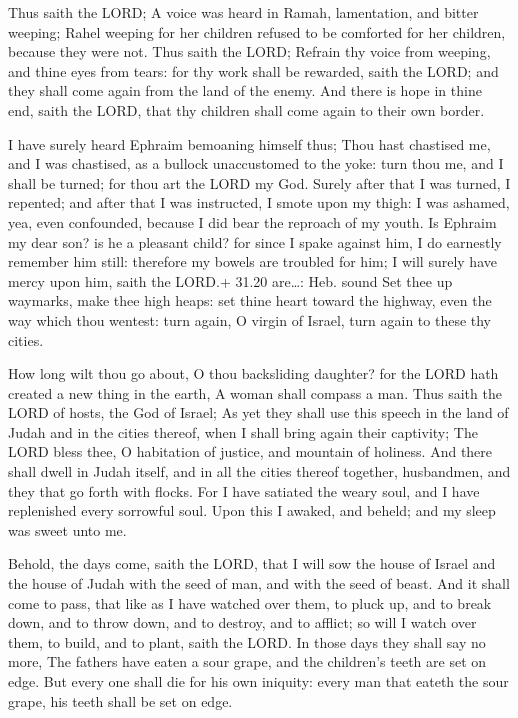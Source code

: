  Thus saith the LORD; A voice was heard in Ramah,
lamentation, and bitter weeping; Rahel weeping for her children refused
to be comforted for her children, because they were not. 
Thus saith the LORD; Refrain thy voice from weeping, and thine eyes from
tears: for thy work shall be rewarded, saith the LORD; and they shall
come again from the land of the enemy.  And there is hope
in thine end, saith the LORD, that thy children shall come again to
their own border.

 I have surely heard Ephraim bemoaning himself thus; Thou
hast chastised me, and I was chastised, as a bullock unaccustomed to the
yoke: turn thou me, and I shall be turned; for thou art the LORD my God.
 Surely after that I was turned, I repented; and after that
I was instructed, I smote upon my thigh: I was ashamed, yea, even
confounded, because I did bear the reproach of my youth. 
Is Ephraim my dear son? is he a pleasant child? for since I spake
against him, I do earnestly remember him still: therefore my bowels are
troubled for him; I will surely have mercy upon him, saith the LORD.+
31.20 are\ldots: Heb. sound  Set thee up waymarks, make
thee high heaps: set thine heart toward the highway, even the way which
thou wentest: turn again, O virgin of Israel, turn again to these thy
cities.

 How long wilt thou go about, O thou backsliding
daughter? for the LORD hath created a new thing in the earth, A woman
shall compass a man.  Thus saith the LORD of hosts, the God
of Israel; As yet they shall use this speech in the land of Judah and in
the cities thereof, when I shall bring again their captivity; The LORD
bless thee, O habitation of justice, and mountain of holiness.
 And there shall dwell in Judah itself, and in all the
cities thereof together, husbandmen, and they that go forth with flocks.
 For I have satiated the weary soul, and I have replenished
every sorrowful soul.  Upon this I awaked, and beheld; and
my sleep was sweet unto me.

 Behold, the days come, saith the LORD, that I will sow
the house of Israel and the house of Judah with the seed of man, and
with the seed of beast.  And it shall come to pass, that
like as I have watched over them, to pluck up, and to break down, and to
throw down, and to destroy, and to afflict; so will I watch over them,
to build, and to plant, saith the LORD.  In those days they
shall say no more, The fathers have eaten a sour grape, and the
children's teeth are set on edge.  But every one shall die
for his own iniquity: every man that eateth the sour grape, his teeth
shall be set on edge.

